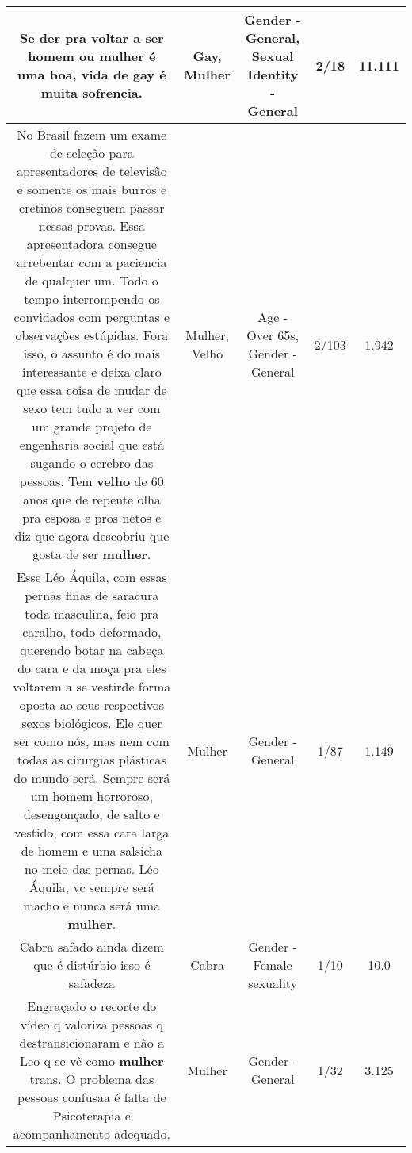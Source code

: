 \documentclass[11pt]{article}
\newlength\mylength
\begin{document}
\begin{center}
\begin{longtable}{|C{.65\mylength}|C{.30\mylength}|C{.12\mylength}|C{.12\mylength}|C{.12\mylength}|}
  \small Se der pra voltar a ser homem ou \textbf{mulher} é uma boa, vida de \textbf{gay} é muita sofrencia.\normalsize   & Gay, Mulher & Gender - General, Sexual Identity - General & 2/18 & 11.111 \\  \hline
  \small No Brasil fazem um exame de seleção para apresentadores de televisão e somente os mais burros e cretinos conseguem passar nessas provas. Essa apresentadora consegue arrebentar com a paciencia de qualquer um. Todo o tempo interrompendo os convidados com perguntas e observações estúpidas. Fora isso, o assunto é do mais interessante e deixa claro que essa coisa de mudar de sexo tem tudo a ver com um grande projeto de engenharia social que está sugando o cerebro das pessoas. Tem \textbf{velho} de 60 anos que de repente olha pra esposa e pros netos e diz que agora descobriu que gosta de ser \textbf{mulher}.\normalsize   & Mulher, Velho & Age - Over 65s, Gender - General & 2/103 & 1.942 \\  \hline
  \small Esse Léo Áquila, com essas pernas finas de saracura toda masculina, feio pra caralho, todo deformado, querendo botar na cabeça do cara e da moça pra eles voltarem a se vestirde forma oposta ao seus respectivos sexos biológicos. Ele quer ser como nós, mas nem com todas as cirurgias plásticas do mundo será. Sempre será um homem horroroso, desengonçado, de salto e vestido, com essa cara larga de homem e uma salsicha no meio das pernas. Léo Áquila, vc sempre será macho e nunca será uma \textbf{mulher}.\normalsize   & Mulher & Gender - General & 1/87 & 1.149 \\  \hline
  \small Cabra safado ainda dizem que é  distúrbio isso é safadeza\normalsize   & Cabra & Gender - Female sexuality & 1/10 & 10.0 \\  \hline
  \small Engraçado o recorte do vídeo q valoriza pessoas q destransicionaram e não a Leo q se vê como \textbf{mulher} trans. O problema das pessoas confusaa é falta de Psicoterapia e acompanhamento adequado.\normalsize   & Mulher & Gender - General & 1/32 & 3.125 \\  \hline

\end{longtable}
\end{center}
\end{document}
